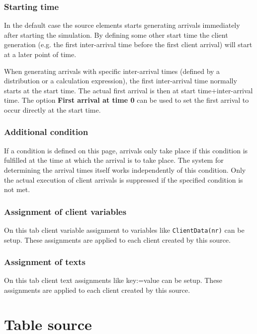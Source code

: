 \subsubsection*{Starting time}

In the default case the source elements starts generating arrivals immediately after
starting the simulation. By defining some other start time the client generation
(e.g. the first inter-arrival time before the first client arrival) will start at a later
point of time.

When generating arrivals with specific inter-arrival times (defined by a distribution
or a calculation expression), the first inter-arrival time normally starts at the start time.
The actual first arrival is then at start time+inter-arrival time. The option
\textbf{First arrival at time 0} can be used to set the first arrival to occur
directly at the start time.

\subsubsection*{Additional condition}

If a condition is defined on this page, arrivals only take place
if this condition is fulfilled at the time at which the arrival is to take place.
The system for determining the arrival times itself works independently of this condition.
Only the actual execution of client arrivals is suppressed if the specified condition is not met.

\subsubsection*{Assignment of client variables}

On this tab client variable assignment to variables like \texttt{ClientData(nr)} can be setup.
These assignments are applied to each client created by this source.

\subsubsection*{Assignment of texts}

On this tab client text assignments like key:=value can be setup.
These assignments are applied to each client created by this source.


\section{Table source}
\label{ref:ModelElementSourceTable}

